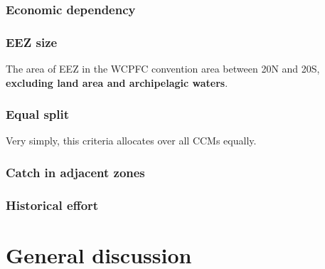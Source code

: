 \documentclass[11pt]{article}
\begin{document}
\subsubsection{Economic dependency}

\subsubsection{EEZ size}
The area of EEZ in the WCPFC convention area between 20\degree N and 20\degree S, {\bf excluding land area and archipelagic waters}.

\subsubsection{Equal split}
Very simply, this criteria allocates over all CCMs equally.

\subsubsection{Catch in adjacent zones} 


\subsubsection{Historical effort}




\section{General discussion}





\newpage

%
\end{document}
